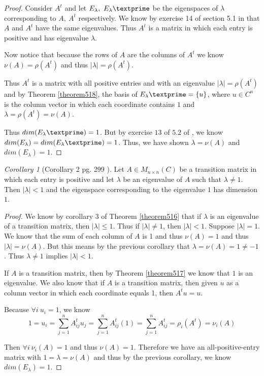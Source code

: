 \documentclass{amsart}
\theoremstyle{definition}
\theoremstyle{remark}
\newtheorem{corollary}{Corollary}[theorem]
\numberwithin{equation}{section}
\begin{document}
\begin{proof}

	Consider $A^t$ and let $E_{\lambda},\ E_{\lambda}\textprime$ be the eigenspaces of $\lambda$ corresponding to $A,\ A^t$ respectively.
	We know by exercise 14 of section 5.1 in \cite{friedberg2003linear} that $A$ and $A^t$ have the same eigenvalues.
	Thus $A^t$ is a matrix in which each entry is positive and has eigenvalue $\lambda$.
	
	Now notice that because the rows of $A$ are the columns of $A^t$ we know $\nu(A) = \rho(A^t)$ and thus $|\lambda| = \rho(A^t)$.


	Thus $A^t$ is a matrix with all positive entries and with an eigenvalue $|\lambda| = \rho(A^t)$ and by Theorem \ref{theorem518}, the basis of $E_{\lambda}\textprime = \{ u \}$, where $u \in C^n$ is the column vector in which each coordinate contains $1$ and $\lambda = \rho(A^t) = \nu(A)$.
	
	Thus $dim(E_{\lambda}\textprime) = 1$.
	But by exercise $13$ of $5.2$ of \cite{friedberg2003linear}, we know $dim(E_{\lambda}) = dim(E_{\lambda}\textprime) = 1$.
	Thus, we have shown $\lambda = \nu(A)$ and $dim(E_{\lambda}) = 1$.

\end{proof}



\begin{corollary}[Corollary 2 pg. 299 \cite{friedberg2003linear}]

	Let $A \in M_{n \times n}(C)$ be a transition matrix in which each entry is positive and let $\lambda$ be an eigenvalue of $A$ such that $\lambda \neq 1$.
	Then  $|\lambda| < 1$ and the eigenspace corresponding to the eigenvalue $1$ has dimension $1$.

\end{corollary}

\begin{proof}
	We know by corollary 3 of Theorem \ref{theorem516} that if $\lambda$ is an eigenvalue of a transition matrix, then $|\lambda| \leq 1$.
	Thus if $|\lambda| \neq 1$, then $|\lambda| < 1$.
	Suppose $|\lambda| = 1$.
	We know that the sum of each column of $A$ is 1 and thus $\nu(A) = 1$ and thus $|\lambda| = \nu(A)$.
	But this means by the previous corollary that $\lambda = \nu(A) = 1 \neq -1$.
	Thus $\lambda \neq 1$ implies $|\lambda| < 1$.

	If $A$ is a transition matrix, then by Theorem \ref{theorem517} we know that $1$ is an eigenvalue. 
	We also know that if $A$ is a transition matrix, then given $u$ as a column vector in which each coordinate equals 1, then $A^tu = u$.

	Because $\forall i\ u_i = 1$, we know
	 $$1 = u_i = \sum_{j = 1}^nA^t_{ij}u_j = \sum_{j = 1}^nA^t_{ij}(1) =  \sum_{j = 1}^nA^t_{ij} = \rho_i(A^t) = \nu_i(A)$$

	Then $\forall i\ \nu_i(A) = 1$ and thus $\nu(A) = 1$.
	Therefore we have an all-positive-entry matrix with $1 = \lambda = \nu(A) $ and thus by the previous corollary, we know $dim(E_{\lambda}) = 1$.


\end{proof}
\end{document}
